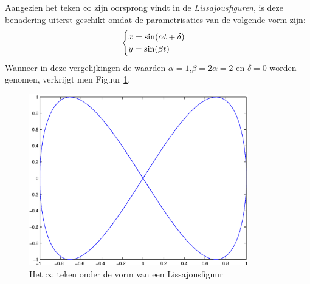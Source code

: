 \documentclass[a4paper]{article}
\begin{document}
Aangezien het teken $\infty$ zijn oorsprong vindt in de \textit{Lissajousfiguren}, is deze benadering uiterst geschikt omdat de parametrisaties van de volgende vorm zijn:
\begin{equation}
    \centering
        \begin{cases}
            x=\sin (\alpha t+\delta)\\
            y=\sin (\beta t)
        \end{cases}
\end{equation}
Wanneer in deze vergelijkingen de waarden $\alpha=1$,$\beta=2\alpha=2$ en $\delta=0$ worden genomen, verkrijgt men Figuur \ref{fig:lissajous}.
\begin{figure}
        \centering
        \includegraphics[width=0.85\textwidth]{lissajous.eps}
        \caption{Het $\infty$ teken onder de vorm van een Lissajousfiguur}
        \label{fig:lissajous}
    \end{figure}
\end{document}
